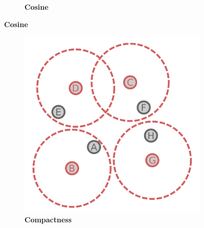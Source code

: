 \begin{figure}
\begin{adjustbox}{minipage=\dimexpr{}\fboxrule,fbox}
\begin{subfigure}[b]{0.45\textwidth}
            \caption[Cosine]{\textbf{Cosine}}
            \label{fig:1.0.2b}
        \end{subfigure}
    \end{adjustbox}
\end{figure}

\begin{figure}
    \caption[A figure]{\textbf{A figure.} A figure.}
    \label{fig:1.0.3}
    
    \begin{adjustbox}{minipage=\dimexpr{}\fboxrule,fbox}
        \begin{subfigure}[b]{0.45\textwidth}
            \includegraphics[width=\textwidth]{Extra_Graphics/Compactness.pdf}
            \caption[Compactness]{\textbf{Compactness}}
            \label{fig:1.0.3a}
        \end{subfigure}
        \hfill
        \begin{subfigure}[b]{0.45\textwidth}

\end{subfigure}
\end{adjustbox}
\end{figure}
